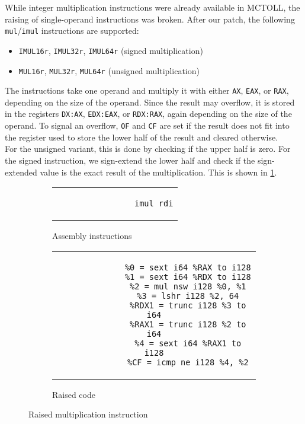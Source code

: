 While integer multiplication instructions were already available in MCTOLL, the raising of single-operand instructions was broken.
After our patch, the following \texttt{mul}/\texttt{imul} instructions are supported:

\begin{itemize}
    \item \texttt{IMUL16r}, \texttt{IMUL32r}, \texttt{IMUL64r} (signed multiplication)
    \item \texttt{MUL16r}, \texttt{MUL32r}, \texttt{MUL64r} (unsigned multiplication)
\end{itemize}

The instructions take one operand and multiply it with either \texttt{AX}, \texttt{EAX}, or \texttt{RAX}, depending on the size of the operand.
Since the result may overflow, it is stored in the registers \texttt{DX:AX}, \texttt{EDX:EAX}, or \texttt{RDX:RAX}, again depending on the size of the operand.
To signal an overflow, \texttt{OF} and \texttt{CF} are set if the result does not fit into the register used to store the lower half of the result and cleared otherwise. \\
For the unsigned variant, this is done by checking if the upper half is zero.
For the signed instruction, we sign-extend the lower half and check if the sign-extended value is the exact result of the multiplication.
This is shown in \cref{fig:raised-imul}.

\begin{figure}[htpb]
    \centering
    \begin{subfigure}{.45\textwidth}
        \begin{tabular}{c}
            \begin{lstlisting}
                imul rdi
            \end{lstlisting}
        \end{tabular}
        \caption{Assembly instructions}
    \end{subfigure}
    \hfill%
    \begin{subfigure}{.45\textwidth}
        \begin{tabular}{c}
            \begin{lstlisting}
              %0 = sext i64 %RAX to i128
              %1 = sext i64 %RDX to i128
              %2 = mul nsw i128 %0, %1
              %3 = lshr i128 %2, 64
              %RDX1 = trunc i128 %3 to i64
              %RAX1 = trunc i128 %2 to i64
              %4 = sext i64 %RAX1 to i128
              %CF = icmp ne i128 %4, %2
            \end{lstlisting}
        \end{tabular}
        \caption{Raised code}
    \end{subfigure}

    \caption{Raised multiplication instruction}
    \label{fig:raised-imul}
\end{figure}

